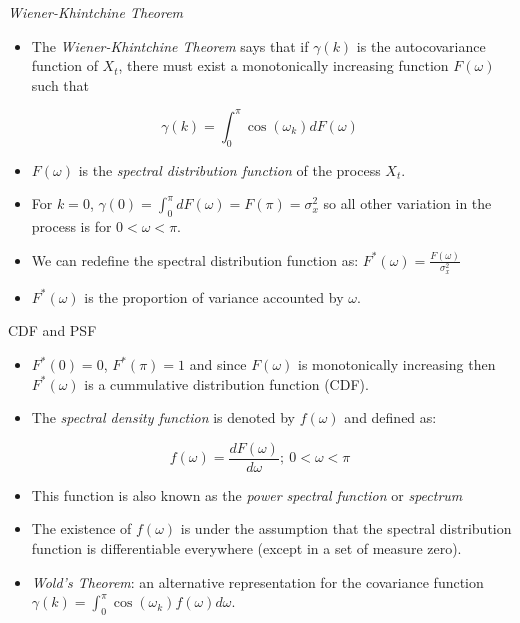 \documentclass[
  ignorenonframetext,
]{beamer}
\providecommand{\tightlist}{%
  \setlength{\itemsep}{0pt}\setlength{\parskip}{0pt}}
\begin{document}
\begin{frame}{}
\protect\hypertarget{section-1}{}
\begin{block}{\emph{Wiener-Khintchine Theorem}}
\protect\hypertarget{wiener-khintchine-theorem}{}
\begin{itemize}
\tightlist
\item
  The \emph{Wiener-Khintchine Theorem} says that if \(\gamma(k)\) is the
  autocovariance function of \(X_t\), there must exist a monotonically
  increasing function \(F(\omega)\) such that
\end{itemize}

\[
\gamma(k) = \int_0^\pi\cos(\omega_k)dF(\omega)
\]

\begin{itemize}
\tightlist
\item
  \(F(\omega)\) is the \emph{spectral distribution function} of the
  process \(X_t\).
\item
  For \(k = 0\),
  \(\gamma(0) = \int_0^\pi dF(\omega) = F(\pi) = \sigma_x^2\) so all
  other variation in the process is for \(0 < \omega < \pi\).
\item
  We can redefine the spectral distribution function as:
  \(F^*(\omega) = \frac {F(\omega)} {\sigma_x^2}\)
\item
  \(F^*(\omega)\) is the proportion of variance accounted by \(\omega\).
\end{itemize}
\end{block}
\end{frame}

\begin{frame}{}
\protect\hypertarget{section-2}{}
\begin{block}{CDF and PSF}
\protect\hypertarget{cdf-and-psf}{}
\begin{itemize}
\item
  \(F^*(0) = 0\), \(F^*(\pi) = 1\) and since \(F(\omega)\) is
  monotonically increasing then \(F^*(\omega)\) is a cummulative
  distribution function (CDF).
\item
  The \emph{spectral density function} is denoted by \(f(\omega)\) and
  defined as:
\end{itemize}

\[
f(\omega) = \frac {dF(\omega)} {d\omega};\ 0 < \omega < \pi
\]

\begin{itemize}
\tightlist
\item
  This function is also known as the \emph{power spectral function} or
  \emph{spectrum}
\item
  The existence of \(f(\omega)\) is under the assumption that the
  spectral distribution function is differentiable everywhere (except in
  a set of measure zero).
\item
  \emph{Wold's Theorem}: an alternative representation for the
  covariance function
  \(\gamma(k) = \int_0^\pi \cos(\omega_k)f(\omega)d\omega\).
\end{itemize}
\end{block}
\end{frame}
\end{document}
